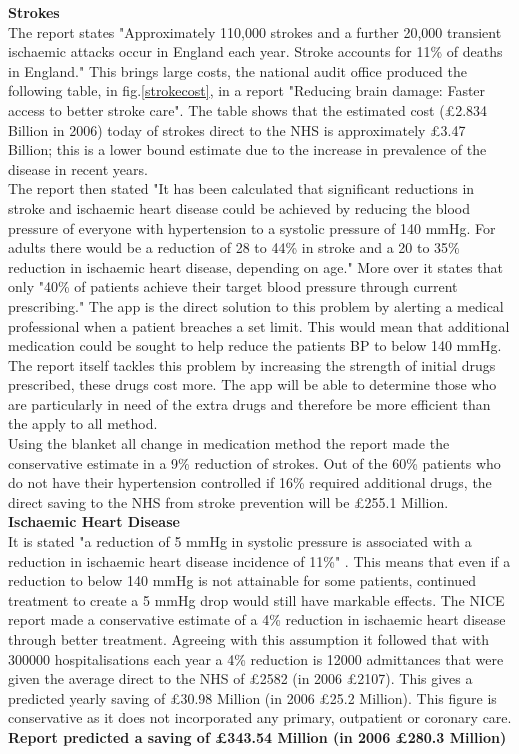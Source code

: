 \documentclass[11pt]{article}
\begin{document}
\textbf{Strokes}
\\
The report states "Approximately 110,000 strokes and a further 20,000 transient ischaemic attacks occur in England each year. Stroke accounts for 11\% of deaths in England." This brings large costs, the national audit office produced the following table, in fig.\ref{strokecost}, in a report "Reducing brain damage: Faster access to better stroke care". The table shows that the estimated cost (\pounds 2.834 Billion in 2006) today of strokes direct to the NHS is approximately \pounds 3.47 Billion; this is a lower bound estimate due to the increase in prevalence of the disease in recent years.
\\ \indent 
The report then stated "It has been calculated that significant reductions in stroke and ischaemic heart disease could be achieved by reducing the blood pressure of everyone with hypertension to a systolic pressure of 140 mmHg. For adults there would be a reduction of 28 to 44\% in stroke and a 20 to 35\% reduction in ischaemic heart disease, depending on age." More over it states that only "40\% of patients achieve their target blood pressure through current prescribing." The app is the direct solution to this problem by alerting a medical professional when a patient breaches a set limit. This would mean that additional medication could be sought to help reduce the patients BP to below 140 mmHg. The report itself tackles this problem by increasing the strength of initial drugs prescribed, these drugs cost more. The app will be able to determine those who are particularly in need of the extra drugs and therefore be more efficient than the apply to all method.
\\ \indent 
Using the blanket all change in medication method the report made the conservative estimate in a 9\% reduction of strokes. Out of the 60\% patients who do not have their hypertension controlled if 16\% required additional drugs, the direct saving to the NHS from stroke prevention will be \pounds 255.1 Million. 
\\
\noindent \textbf{Ischaemic Heart Disease}
\\
It is stated  "a reduction of 5 mmHg in systolic pressure is associated with a reduction in ischaemic heart disease incidence of 11\%" \cite{isch}. This means that even if a reduction to below 140 mmHg is not attainable for some patients, continued treatment to create a 5 mmHg drop would still have markable effects. The NICE report made a conservative estimate of a 4\% reduction in ischaemic heart disease through better treatment. Agreeing with this assumption it followed that with 300000 hospitalisations each year a 4\% reduction is 12000 admittances that were given the average direct to the NHS of \pounds 2582 (in 2006 \pounds 2107). This gives a predicted yearly saving of \pounds 30.98 Million (in 2006 \pounds 25.2 Million). This figure is conservative as it does not incorporated any primary, outpatient or coronary care.
\\
\minipage{\textwidth}
\centering
\textbf{Report predicted a saving of \pounds 343.54 Million (in 2006 \pounds 280.3 Million)}
\endminipage
\end{document}
